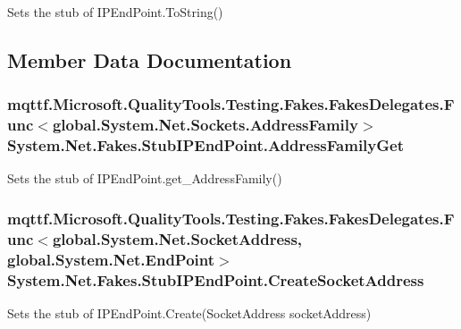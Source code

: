 Sets the stub of I\-P\-End\-Point.\-To\-String()



\subsection{Member Data Documentation}
\hypertarget{class_system_1_1_net_1_1_fakes_1_1_stub_i_p_end_point_a89c1b691bdd9c811096845efa23c367c}{
\subsubsection[{Address\-Family\-Get}]{\setlength{\rightskip}{0pt plus 5cm}mqttf.\-Microsoft.\-Quality\-Tools.\-Testing.\-Fakes.\-Fakes\-Delegates.\-Func$<$global.\-System.\-Net.\-Sockets.\-Address\-Family$>$ System.\-Net.\-Fakes.\-Stub\-I\-P\-End\-Point.\-Address\-Family\-Get}}\label{class_system_1_1_net_1_1_fakes_1_1_stub_i_p_end_point_a89c1b691bdd9c811096845efa23c367c}


Sets the stub of I\-P\-End\-Point.\-get\-\_\-\-Address\-Family()

\hypertarget{class_system_1_1_net_1_1_fakes_1_1_stub_i_p_end_point_ac67fd199f9b3d7da0b0da46a476d8c07}{
\subsubsection[{Create\-Socket\-Address}]{\setlength{\rightskip}{0pt plus 5cm}mqttf.\-Microsoft.\-Quality\-Tools.\-Testing.\-Fakes.\-Fakes\-Delegates.\-Func$<$global.\-System.\-Net.\-Socket\-Address, global.\-System.\-Net.\-End\-Point$>$ System.\-Net.\-Fakes.\-Stub\-I\-P\-End\-Point.\-Create\-Socket\-Address}}\label{class_system_1_1_net_1_1_fakes_1_1_stub_i_p_end_point_ac67fd199f9b3d7da0b0da46a476d8c07}


Sets the stub of I\-P\-End\-Point.\-Create(\-Socket\-Address socket\-Address)

